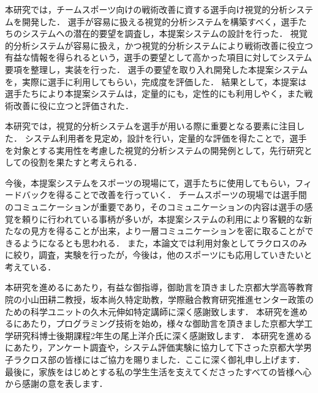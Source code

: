 \documentclass[sotsuron]{kuee}
\begin{document}
	本研究では，チームスポーツ向けの戦術改善に資する選手向け視覚的分析システムを開発した．
	選手が容易に扱える視覚的分析システムを構築すべく，選手たちのシステムへの潜在的要望を調査し，本提案システムの設計を行った．
	視覚的分析システムが容易に扱え，かつ視覚的分析システムにより戦術改善に役立つ有益な情報を得られるという，選手の要望として高かった項目に対してシステム要項を整理し，実装を行った．
	選手の要望を取り入れ開発した本提案システムを，実際に選手に利用してもらい，完成度を評価した．
	結果として，本提案は選手たちにより本提案システムは，定量的にも，定性的にも利用しやく，また戦術改善に役に立つと評価された．

	本研究では，視覚的分析システムを選手が用いる際に重要となる要素に注目した．
	システム利用者を見定め，設計を行い，定量的な評価を得たことで，選手を対象とする実用性を考慮した視覚的分析システムの開発例として，先行研究としての役割を果たすと考えられる．

	今後，本提案システムをスポーツの現場にて，選手たちに使用してもらい，フィードバックを得ることで改善を行っていく．
	チームスポーツの現場では選手間のコミュニケーションが重要であり，そのコミュニケーションの内容は選手の感覚を頼りに行われている事柄が多いが，本提案システムの利用により客観的な新たなの見方を得ることが出来，より一層コミュニケーションを密に取ることができるようになるとも思われる．
	また，本論文では利用対象としてラクロスのみに絞り，調査，実験を行ったが，今後は，他のスポーツにも応用していきたいと考えている．



\begin{acknowledgements}
	本研究を進めるにあたり，有益な御指導，御助言を頂きました京都大学高等教育院の小山田耕二教授，坂本尚久特定助教，学際融合教育研究推進センター政策のための科学ユニットの久木元伸如特定講師に深く感謝致します．
	本研究を進めるにあたり，プログラミング技術を始め，様々な御助言を頂きました京都大学工学研究科博士後期課程2年生の尾上洋介氏に深く感謝致します．
	本研究を進めるにあたり，アンケート調査や，システム評価実験に協力して下さった京都大学男子ラクロス部の皆様にはご協力を賜りました．ここに深く御礼申し上げます．
	最後に，家族をはじめとする私の学生生活を支えてくださったすべての皆様へ心から感謝の意を表します．
\end{acknowledgements}





\end{document}
